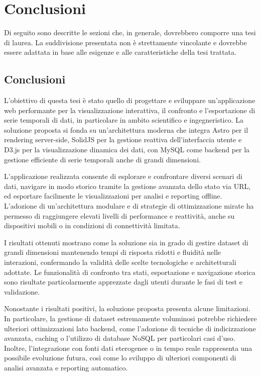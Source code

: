 \clearpage
\thispagestyle{empty} %
\cleardoublepage %

\chapter{Conclusioni}
\label{chap:conclusioni}

Di seguito sono descritte le sezioni che, in generale, dovrebbero comporre una tesi di laurea. La suddivisione presentata non è strettamente vincolante e dovrebbe essere adattata in base alle esigenze e alle caratteristiche della tesi trattata.

\section{Conclusioni}

L’obiettivo di questa tesi è stato quello di progettare e sviluppare un’applicazione web performante per la visualizzazione interattiva, il confronto e l’esportazione di serie temporali di dati, in particolare in ambito scientifico e ingegneristico. La soluzione proposta si fonda su un’architettura moderna che integra Astro per il rendering server-side, SolidJS per la gestione reattiva dell’interfaccia utente e D3.js per la visualizzazione dinamica dei dati, con MySQL come backend per la gestione efficiente di serie temporali anche di grandi dimensioni.

L’applicazione realizzata consente di esplorare e confrontare diversi scenari di dati, navigare in modo storico tramite la gestione avanzata dello stato via URL, ed esportare facilmente le visualizzazioni per analisi e reporting offline. L’adozione di un’architettura modulare e di strategie di ottimizzazione mirate ha permesso di raggiungere elevati livelli di performance e reattività, anche su dispositivi mobili o in condizioni di connettività limitata.

I risultati ottenuti mostrano come la soluzione sia in grado di gestire dataset di grandi dimensioni mantenendo tempi di risposta ridotti e fluidità nelle interazioni, confermando la validità delle scelte tecnologiche e architetturali adottate. Le funzionalità di confronto tra stati, esportazione e navigazione storica sono risultate particolarmente apprezzate dagli utenti durante le fasi di test e validazione.

Nonostante i risultati positivi, la soluzione proposta presenta alcune limitazioni. In particolare, la gestione di dataset estremamente voluminosi potrebbe richiedere ulteriori ottimizzazioni lato backend, come l’adozione di tecniche di indicizzazione avanzata, caching o l’utilizzo di database NoSQL per particolari casi d’uso. Inoltre, l’integrazione con fonti dati eterogenee o in tempo reale rappresenta una possibile evoluzione futura, così come lo sviluppo di ulteriori componenti di analisi avanzata e reporting automatico.

